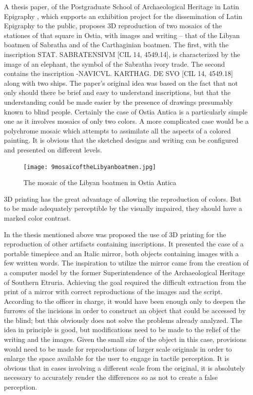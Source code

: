 \documentclass[amsthm,ebook]{saparticle}
\begin{document}
A thesis paper, of the Postgraduate School of Archaeological Heritage in Latin Epigraphy \citep{Licordari2015}, which
supports an exhibition project for the dissemination of Latin Epigraphy to the public, proposes 3D reproduction of two
mosaics of the stationes of that square in Ostia, with images and writing – that of the Libyan boatmen of Sabratha and
of the Carthaginian boatmen. The first, with the inscription STAT. SABRATENSIVM [CIL 14, 4549.14], is characterized by
the image of an elephant, the symbol of the Sabratha ivory trade. The second contains the inscription -NAVICVL.
KARTHAG. DE SVO [CIL 14, 4549.18] along with two ships. The paper’s original idea was based on the fact that not only
should there be brief and easy to understand inscriptions, but that the understanding could be made easier by the
presence of drawings presumably known to blind people. Certainly the case of Ostia Antica is a particularly simple one
as it involves mosaics of only two colors. A more complicated case would be a polychrome mosaic which attempts to
assimilate all the aspects of a colored painting. It is obvious that the sketched designs and writing can be configured
and presented on different levels.

\begin{figure}[!hbp]
\centering
 \texttt{[image: 9mosaicoftheLibyanboatmen.jpg]}
\caption{The mosaic of the Libyan boatmen in Ostia Antica}
\label{fig:9}
\end{figure}


3D printing has the great advantage of allowing the reproduction of colors. But to be made adequately perceptible by the
visually impaired, they should have a marked color contrast.

In the thesis mentioned above was proposed the use of 3D printing for the reproduction of other artifacts containing
inscriptions. It presented the case of a portable timepiece and an Italic mirror, both objects containing images with a
few written words. The inspiration to utilize the mirror came from the creation of a computer model by the former
Superintendence of the Archaeological Heritage of Southern Etruria. Achieving the goal required the difficult
extraction from the print of a mirror with correct reproductions of the images and the script. According to the officer
in charge, it would have been enough only to deepen the furrows of the incisions in order to construct an object that
could be accessed by the blind; but this obviously does not solve the problems already analyzed. The idea in principle
is good, but modifications need to be made to the relief of the writing and the images. Given the small size of the
object in this case, provisions would need to be made for reproductions of larger scale originals in order to enlarge
the space available for the user to engage in tactile perception. It is obvious that in cases involving a different
scale from the original, it is absolutely necessary to accurately render the differences so as not to create a false
perception.
\end{document}
